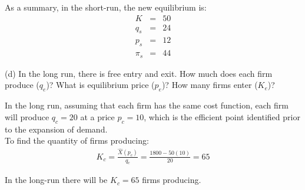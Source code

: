 \begin{myanswerbox}
    As a summary, in the short-run, the new equilibrium is:
    \begin{eqnarray*}
    K &=& 50\\
    q_s &=& 24\\
    p_s &=& 12\\
    \pi_s &=& 44
    \end{eqnarray*}
\end{myanswerbox}
\begin{tcolorbox}
   (d) In the long run, there is free entry and exit. How much does each firm produce (\( q_e \))? What is equilibrium price (\( p_e \))? How many firms enter (\( K_e \))?
\end{tcolorbox}
    
In the long run, assuming that each firm has the same cost function, each firm will produce \( q_c = 20 \) at a price \( p_c = 10 \), which is the efficient point identified prior to the expansion of demand.\\
    
To find the quantity of firms producing:
\begin{eqnarray*}
K_c = \frac{\hat{X}(p_c)}{q_c} = \frac{1800 - 50(10)}{20} = 65
\end{eqnarray*}

\begin{myanswerbox}
    In the long-run there will be \( K_c = 65 \) firms producing.
\end{myanswerbox}

